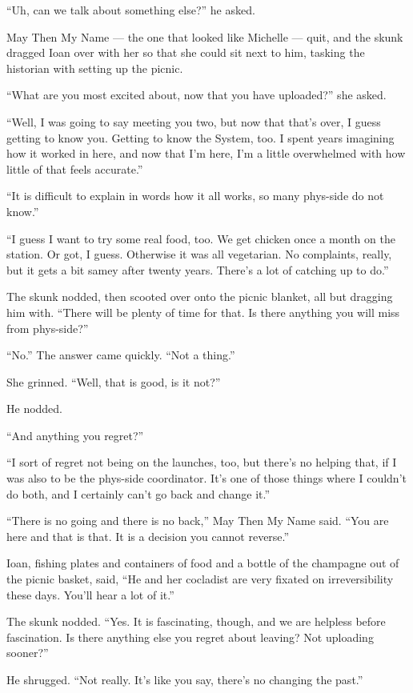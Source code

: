``Uh, can we talk about something else?'' he asked.

May Then My Name — the one that looked like Michelle — quit, and the skunk dragged Ioan over with her so that she could sit next to him, tasking the historian with setting up the picnic.

``What are you most excited about, now that you have uploaded?'' she asked.

``Well, I was going to say meeting you two, but now that that's over, I guess getting to know you. Getting to know the System, too. I spent years imagining how it worked in here, and now that I'm here, I'm a little overwhelmed with how little of that feels accurate.''

``It is difficult to explain in words how it all works, so many phys-side do not know.''

``I guess I want to try some real food, too. We get chicken once a month on the station. Or got, I guess. Otherwise it was all vegetarian. No complaints, really, but it gets a bit samey after twenty years. There's a lot of catching up to do.''

The skunk nodded, then scooted over onto the picnic blanket, all but dragging him with. ``There will be plenty of time for that. Is there anything you will miss from phys-side?''

``No.'' The answer came quickly. ``Not a thing.''

She grinned. ``Well, that is good, is it not?''

He nodded.

``And anything you regret?''

``I sort of regret not being on the launches, too, but there's no helping that, if I was also to be the phys-side coordinator. It's one of those things where I couldn't do both, and I certainly can't go back and change it.''

``There is no going and there is no back,'' May Then My Name said. ``You are here and that is that. It is a decision you cannot reverse.''

Ioan, fishing plates and containers of food and a bottle of the champagne out of the picnic basket, said, ``He and her cocladist are very fixated on irreversibility these days. You'll hear a lot of it.''

The skunk nodded. ``Yes. It is fascinating, though, and we are helpless before fascination. Is there anything else you regret about leaving? Not uploading sooner?''

He shrugged. ``Not really. It's like you say, there's no changing the past.''

